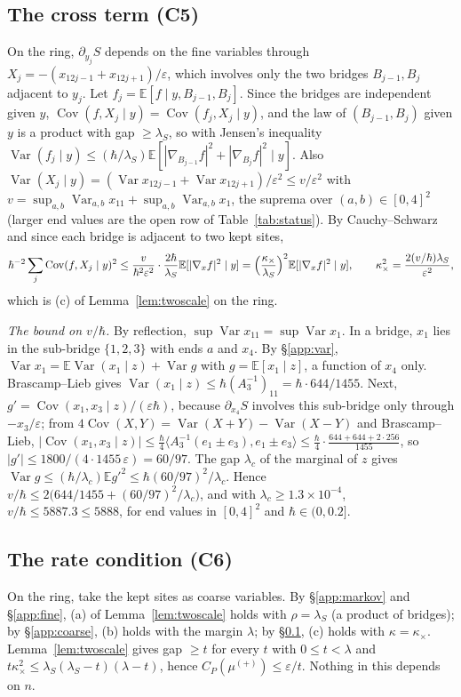 \documentclass[11pt,a4paper]{article}
\theoremstyle{definition}
\theoremstyle{remark}
\newcommand{\E}{\mathbb{E}}
\DeclareMathOperator{\Cov}{Cov}
\DeclareMathOperator{\Var}{Var}
\begin{document}
\subsection{The cross term (C5)}\label{app:cross}
On the ring, $\partial_{y_j}S$ depends on the fine variables through $X_j=-(x_{12j-1}+x_{12j+1})/\varepsilon$, which involves only the two bridges $B_{j-1},B_j$ adjacent to $y_j$. Let $f_j=\E[f\mid y,B_{j-1},B_j]$. Since the bridges are independent given $y$, $\Cov(f,X_j\mid y)=\Cov(f_j,X_j\mid y)$, and the law of $(B_{j-1},B_j)$ given $y$ is a product with gap $\ge\lambda_S$, so with Jensen's inequality $\Var(f_j\mid y)\le(\hbar/\lambda_S)\E[|\nabla_{B_{j-1}}f|^2+|\nabla_{B_j}f|^2\mid y]$. Also $\Var(X_j\mid y)=(\Var x_{12j-1}+\Var x_{12j+1})/\varepsilon^2\le v/\varepsilon^2$ with $v=\sup_{a,b}\Var_{a,b}x_{11}+\sup_{a,b}\Var_{a,b}x_1$, the suprema over $(a,b)\in[0,4]^2$ (larger end values are the open row of Table~\ref{tab:status}). By Cauchy--Schwarz and since each bridge is adjacent to two kept sites,
\[
\hbar^{-2}\sum_j\Cov(f,X_j\mid y)^2\le\frac{v}{\hbar^2\varepsilon^2}\cdot\frac{2\hbar}{\lambda_S}\E[|\nabla_xf|^2\mid y]=\Bigl(\frac{\kappa_\times}{\lambda_S}\Bigr)^2\E[|\nabla_xf|^2\mid y],\qquad\kappa_\times^2=\frac{2(v/\hbar)\lambda_S}{\varepsilon^2},
\]
which is (c) of Lemma~\ref{lem:twoscale} on the ring.

\emph{The bound on $v/\hbar$.} By reflection, $\sup\Var x_{11}=\sup\Var x_1$. In a bridge, $x_1$ lies in the sub-bridge $\{1,2,3\}$ with ends $a$ and $x_4$. By \S\ref{app:var}, $\Var x_1=\E\Var(x_1\mid z)+\Var g$ with $g=\E[x_1\mid z]$, a function of $x_4$ only. Brascamp--Lieb gives $\Var(x_1\mid z)\le\hbar(A_3^{-1})_{11}=\hbar\cdot644/1455$. Next, $g'=\Cov(x_1,x_3\mid z)/(\varepsilon\hbar)$, because $\partial_{x_4}S$ involves this sub-bridge only through $-x_3/\varepsilon$; from $4\Cov(X,Y)=\Var(X+Y)-\Var(X-Y)$ and Brascamp--Lieb, $|\Cov(x_1,x_3\mid z)|\le\frac\hbar4\langle A_3^{-1}(e_1\pm e_3),e_1\pm e_3\rangle\le\frac\hbar4\cdot\frac{644+644+2\cdot256}{1455}$, so $|g'|\le1800/(4\cdot1455\,\varepsilon)=60/97$. The gap $\lambda_c$ of the marginal of $z$ gives $\Var g\le(\hbar/\lambda_c)\E g'^2\le\hbar(60/97)^2/\lambda_c$. Hence $v/\hbar\le2\bigl(644/1455+(60/97)^2/\lambda_c\bigr)$, and with $\lambda_c\ge1.3\times10^{-4}$, $v/\hbar\le5887.3\le5888$, for end values in $[0,4]^2$ and $\hbar\in(0,0.2]$.

\subsection{The rate condition (C6)}\label{app:rate}
On the ring, take the kept sites as coarse variables. By \S\ref{app:markov} and \S\ref{app:fine}, (a) of Lemma~\ref{lem:twoscale} holds with $\rho=\lambda_S$ (a product of bridges); by \S\ref{app:coarse}, (b) holds with the margin $\lambda$; by \S\ref{app:cross}, (c) holds with $\kappa=\kappa_\times$. Lemma~\ref{lem:twoscale} gives gap $\ge t$ for every $t$ with $0\le t<\lambda$ and $t\kappa_\times^2\le\lambda_S(\lambda_S-t)(\lambda-t)$, hence $C_P(\mu^{(+)})\le\varepsilon/t$. Nothing in this depends on $n$.
\end{document}
